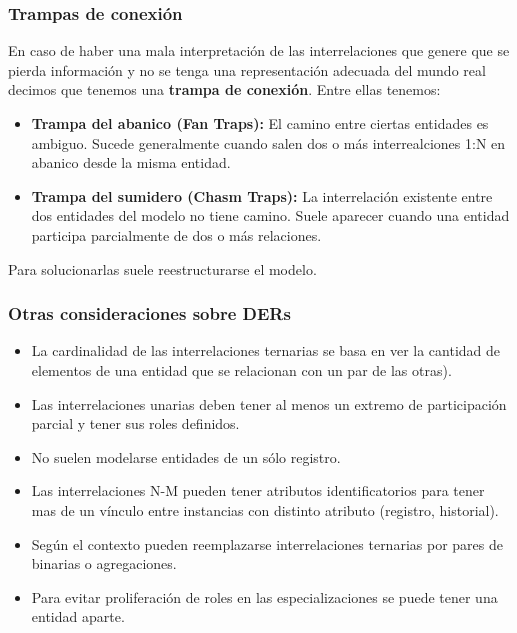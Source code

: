\subsubsection*{Trampas de conexión}
En caso de haber una mala interpretación de las interrelaciones que genere que se pierda información y no se tenga una representación adecuada del mundo real decimos que tenemos una \textbf{trampa de conexión}. Entre ellas tenemos:
\begin{itemize}
    \item \textbf{Trampa del abanico (Fan Traps):} El camino entre ciertas entidades es ambiguo. Sucede generalmente cuando salen dos o más interrealciones 1:N en abanico desde la misma entidad.
    \item \textbf{Trampa del sumidero (Chasm Traps):} La interrelación existente entre dos entidades del modelo no tiene camino. Suele aparecer cuando una entidad participa parcialmente de dos o más relaciones.
\end{itemize}
Para solucionarlas suele reestructurarse el modelo.

\subsubsection*{Otras consideraciones sobre DERs}
\begin{itemize}
    \item La cardinalidad de las interrelaciones ternarias se basa en ver la cantidad de elementos de una entidad que se relacionan con un par de las otras).
    \item Las interrelaciones unarias deben tener al menos un extremo de participación parcial y tener sus roles definidos.
    \item No suelen modelarse entidades de un sólo registro.
    \item Las interrelaciones N-M pueden tener atributos identificatorios para tener mas de un vínculo entre instancias con distinto atributo (registro, historial).
    \item Según el contexto pueden reemplazarse interrelaciones ternarias por pares de binarias o agregaciones.
    \item Para evitar proliferación de roles en las especializaciones se puede tener una entidad aparte.
\end{itemize}

